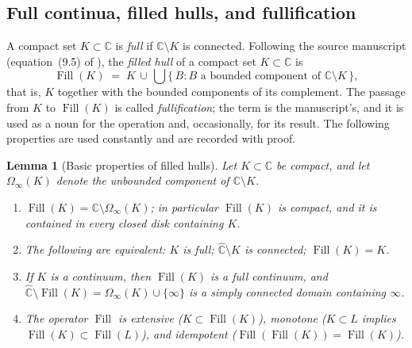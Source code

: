\documentclass[11pt,reqno]{amsart}
\newtheorem{lemma}[theorem]{Lemma}
\theoremstyle{definition}
\theoremstyle{remark}
\newcommand{\C}{\mathbb C}
\newcommand{\Chat}{\widehat{\mathbb C}}
\newcommand{\Fill}{\operatorname{Fill}}
\begin{document}
\subsection{Full continua, filled hulls, and fullification}
\label{subsec:A-full}

A compact set $K\subset\C$ is \emph{full} if $\C\setminus K$ is connected.
Following the source manuscript (equation~(9.5) of \cite{MWman}), the
\emph{filled hull} of a compact set $K\subset\C$ is
\begin{equation}\label{eq:A-fill}
\Fill(K)\;=\;K\,\cup\,
\bigcup\bigl\{\,B : B \text{ a bounded component of }\C\setminus K\,\bigr\},
\end{equation}
that is, $K$ together with the bounded components of its complement.  The
passage from $K$ to $\Fill(K)$ is called \emph{fullification}; the term is
the manuscript's, and it is used as a noun for the operation and,
occasionally, for its result.  The following properties are used
constantly and are recorded with proof.

\begin{lemma}[Basic properties of filled hulls]\label{lem:A-full}
Let $K\subset\C$ be compact, and let $\Omega_\infty(K)$ denote the
unbounded component of $\C\setminus K$.
\begin{enumerate}
\item $\Fill(K)=\C\setminus\Omega_\infty(K)$; in particular $\Fill(K)$ is
compact, and it is contained in every closed disk containing $K$.
\item The following are equivalent: $K$ is full; $\Chat\setminus K$ is
connected; $\Fill(K)=K$.
\item If $K$ is a continuum, then $\Fill(K)$ is a full continuum, and
$\Chat\setminus\Fill(K)=\Omega_\infty(K)\cup\{\infty\}$ is a simply
connected domain containing $\infty$.
\item The operator $\Fill$ is extensive ($K\subset\Fill(K)$), monotone
($K\subset L$ implies $\Fill(K)\subset\Fill(L)$), and idempotent
($\Fill(\Fill(K))=\Fill(K)$).
\end{enumerate}
\end{lemma}
\end{document}
